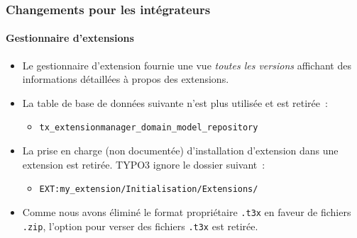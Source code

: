 %

\begin{frame}[fragile]
	\frametitle{Changements pour les intégrateurs}
	\framesubtitle{Gestionnaire d'extensions}

	\begin{itemize}

		\item Le gestionnaire d'extension fournie une vue \textit{toutes les versions}
			affichant des informations détaillées à propos des extensions.

		\item La table de base de données suivante n'est plus utilisée et est retirée~:
			\begin{itemize}\small
				\item \texttt{tx\_extensionmanager\_domain\_model\_repository}
			\end{itemize}\normalsize
			\vspace{0.2cm}

		\item La prise en charge (non documentée) d'installation d'extension dans une extension
			est retirée. TYPO3 ignore le dossier suivant~:
			\begin{itemize}\small
				\item \texttt{EXT:my\_extension/Initialisation/Extensions/}
			\end{itemize}
			\vspace{0.2cm}

		\item Comme nous avons éliminé le format propriétaire \texttt{.t3x} en faveur
			de fichiers \texttt{.zip}, l'option pour verser des fichiers \texttt{.t3x}
			est retirée.

	\end{itemize}

\end{frame}

